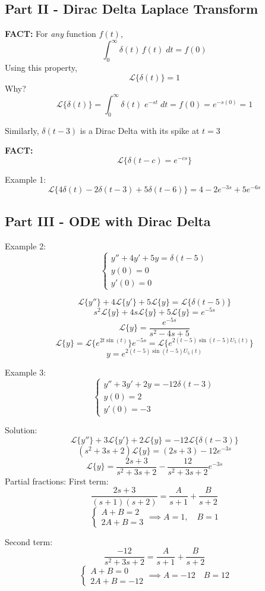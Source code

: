 \documentclass[12pt]{article}
\renewcommand{\L}[1]{\mathcal{L}\{#1\}}
\begin{document}
\subsection*{Part II - Dirac Delta Laplace Transform}
\textbf{FACT:} For \emph{any} function $f(t)$, 
\[\int_0^{\infty} \delta(t) \, f(t) \; dt = f(0)\]
Using this property, 
\[\boxed{\L{\delta (t)} = 1}\]
Why?
\[\L{\delta (t)} = \int_0^{\infty}\delta(t)\; e^{-st}\; dt = f(0) = e^{-s(0)} = 1\]

Similarly, $\delta(t - 3)$ is a Dirac Delta with its spike at $t = 3$

\textbf{FACT:}
\[\L{\delta(t - c) = e^{-cs}}\]

Example 1:
\[\L{4\delta(t) - 2\delta(t - 3) + 5\delta(t - 6)} = 4 - 2e^{-3s} + 5e^{-6s}\]

\subsection*{Part III - ODE with Dirac Delta}
Example 2: 
\[\begin{cases}
    y'' + 4y' + 5y = \delta(t - 5)\\
    y(0) = 0\\
    y'(0) = 0
\end{cases}\]

\[\L{y''} + 4\L{y'} + 5\L{y} = \L{\delta (t - 5)}\]
\[s^2 \L{y} + 4s\L{y} + 5\L{y} = e^{-5s}\]
\[\L{y} = \frac{e^{-5s}}{s^2 - 4s + 5}\]
\[\L{y} = \L{e^{2t\sin(t)}} e^{-5s} = \L{e^{2(t- 5) \sin(t - 5) U_5(t)}}\]
\[y = e^{2(t- 5) \sin(t - 5) U_5(t)}\]

Example 3: 
\[\begin{cases}
    y'' + 3y' + 2y = -12\delta(t - 3)\\
    y(0) = 2\\
    y'(0) = -3
\end{cases}\]

Solution:
\[\L{y''} + 3\L{y'} + 2\L{y} = -12\L{\delta(t- 3)}\]
\[(s^2 + 3s + 2) \L{y} = (2s + 3) -12e^{-3s}\]
\[\L{y} =\frac{2s + 3}{s^2 + 3s +2} - \frac{12}{s^2 + 3s +2}e^{-3s}\]
Partial fractions:
First term: 
\[\frac{2s + 3}{(s + 1)(s + 2)} = \frac{A}{s+1} + \frac{B}{s + 2}\]
\[\begin{cases}
    A + B = 2\\
    2A + B = 3
\end{cases} \implies A = 1, \quad B = 1\]

Second term: 
\[\frac{-12}{s^2 + 3s+2} = \frac{A}{s+ 1} + \frac{B}{s+2}\]
\[\begin{cases}
    A+B = 0\\
    2A + B = -12
\end{cases} \implies A = -12 \quad B = 12\]
\end{document}

